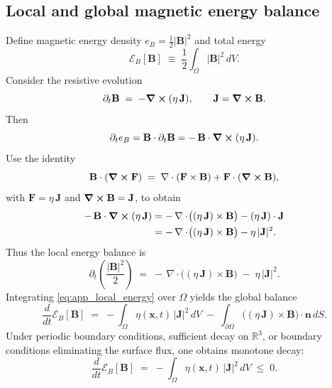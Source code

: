 \documentclass[11pt]{article}
\theoremstyle{plain}
\theoremstyle{definition}
\theoremstyle{remark}
\newcommand{\R}{\mathbb{R}}
\newcommand{\diver}{\nabla\cdot}
\newcommand{\B}{\mathbf{B}}
\newcommand{\J}{\mathbf{J}}
\begin{document}
\subsection{Local and global magnetic energy balance}
Define magnetic energy density $e_B=\tfrac12|\B|^2$ and total energy
\begin{equation}\label{eq:app_EB_def}
  \mathcal{E}_B[\B] \;\equiv\; \frac{1}{2}\int_{\Omega}|\B|^2\,dV.
\end{equation}
Consider the resistive evolution
\begin{equation}\label{eq:app_B_res}
  \partial_t\B \;=\; -\curl(\eta\,\J),
  \qquad \J=\curl\B.
\end{equation}
Then
\begin{equation}\label{eq:app_energy_start}
  \partial_t e_B = \B\cdot\partial_t\B = -\,\B\cdot\curl(\eta\,\J).
\end{equation}
Use the identity
\begin{equation}\label{eq:app_B_dot_curl_id}
  \B\cdot(\curl\mathbf{F})
  \;=\;
  \diver(\mathbf{F}\times\B) + \mathbf{F}\cdot(\curl\B),
\end{equation}
with $\mathbf{F}=\eta\,\J$ and $\curl\B=\J$, to obtain
\begin{align}
  -\,\B\cdot\curl(\eta\,\J)
  &=
  -\,\diver\!\big((\eta\,\J)\times\B\big) - (\eta\,\J)\cdot\J \\
  &=
  -\,\diver\!\big((\eta\,\J)\times\B\big) - \eta\,|\J|^2.
\end{align}
Thus the local energy balance is
\begin{equation}\label{eq:app_local_energy}
  \partial_t\!\left(\frac{|\B|^2}{2}\right)
  \;=\;
  -\,\diver\!\big((\eta\,\J)\times\B\big)
  \;-\;
  \eta\,|\J|^2.
\end{equation}
Integrating \eqref{eq:app_local_energy} over $\Omega$ yields the global balance
\begin{equation}\label{eq:app_global_energy}
  \frac{d}{dt}\mathcal{E}_B[\B]
  \;=\;
  -\int_{\Omega}\eta(\mathbf{x},t)\,|\J|^2\,dV
  \;-\;
  \int_{\partial\Omega}\big((\eta\,\J)\times\B\big)\cdot\mathbf{n}\,dS.
\end{equation}
Under periodic boundary conditions, sufficient decay on $\R^3$, or boundary conditions eliminating the
surface flux, one obtains monotone decay:
\begin{equation}\label{eq:app_monotone_energy}
  \frac{d}{dt}\mathcal{E}_B[\B]
  \;=\;
  -\int_{\Omega}\eta(\mathbf{x},t)\,|\J|^2\,dV
  \;\le\; 0.
\end{equation}
\end{document}
